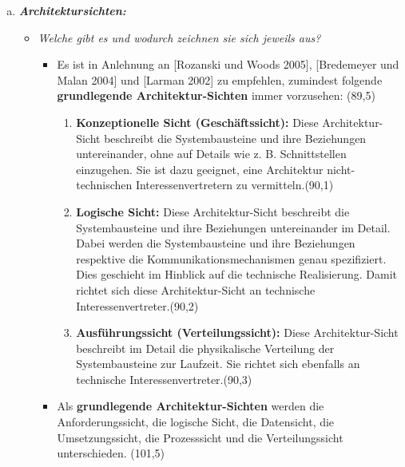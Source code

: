 \begin{enumerate}[(a)]
\begin{itemize}
\begin{itemize}
        \end{itemize}
        
    \end{itemize}
    
    
  

    \item {\itshape \textbf{Architektursichten:}}
    \begin{itemize}
        \item {\itshape Welche gibt es und wodurch zeichnen sie sich jeweils aus?}
        \begin{itemize}
        
            \item Es ist in Anlehnung an [Rozanski und Woods 2005], [Bredemeyer und Malan 2004] und [Larman 2002] zu empfehlen, zumindest folgende \textbf{grundlegende Architektur-Sichten} immer vorzusehen: (89,5)
            \begin{enumerate}[1.]
            
                \item \textbf{Konzeptionelle Sicht (Geschäftssicht):} Diese Architektur-Sicht beschreibt die Systembausteine und ihre Beziehungen untereinander, ohne auf Details wie z. B. Schnittstellen einzugehen. Sie ist dazu geeignet, eine Architektur nicht-technischen Interessenvertretern zu vermitteln.(90,1)
                
                \item \textbf{Logische Sicht:} Diese Architektur-Sicht beschreibt die Systembausteine und ihre Beziehungen untereinander im Detail. Dabei werden die Systembausteine und ihre Beziehungen respektive die Kommunikationsmechanismen genau spezifiziert. Dies geschieht im Hinblick auf die technische Realisierung. Damit richtet sich diese Architektur-Sicht an technische Interessenvertreter.(90,2)
            
                \item \textbf{Ausführungssicht (Verteilungssicht):} Diese Architektur-Sicht beschreibt im Detail die physikalische Verteilung der Systembausteine zur Laufzeit. Sie richtet sich ebenfalls an technische Interessenvertreter.(90,3)
            \end{enumerate}
            
            
            
            \item Als \textbf{grundlegende Architektur-Sichten} werden die Anforderungssicht, die logische Sicht, die Datensicht, die Umsetzungssicht, die Prozesssicht und die Verteilungssicht unterschieden. (101,5)
            \begin{enumerate}[1.]
                

\end{enumerate}
\end{itemize}
\end{itemize}
\end{enumerate}
